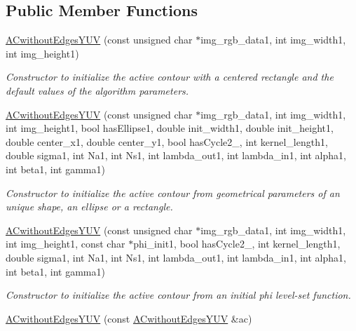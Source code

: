 \subsection*{Public Member Functions}
\begin{DoxyCompactItemize}
\item 
\hypertarget{classofeli_1_1_a_cwithout_edges_y_u_v_a80d0dc7b755e098cf08f1e155ec3e685}{\hyperlink{classofeli_1_1_a_cwithout_edges_y_u_v_a80d0dc7b755e098cf08f1e155ec3e685}{A\-Cwithout\-Edges\-Y\-U\-V} (const unsigned char $\ast$img\-\_\-rgb\-\_\-data1, int img\-\_\-width1, int img\-\_\-height1)}\label{classofeli_1_1_a_cwithout_edges_y_u_v_a80d0dc7b755e098cf08f1e155ec3e685}

\begin{DoxyCompactList}\small\item\em Constructor to initialize the active contour with a centered rectangle and the default values of the algorithm parameters. \end{DoxyCompactList}\item 
\hyperlink{classofeli_1_1_a_cwithout_edges_y_u_v_a31765b6ebe4825cc2a1ea815d1235c22}{A\-Cwithout\-Edges\-Y\-U\-V} (const unsigned char $\ast$img\-\_\-rgb\-\_\-data1, int img\-\_\-width1, int img\-\_\-height1, bool has\-Ellipse1, double init\-\_\-width1, double init\-\_\-height1, double center\-\_\-x1, double center\-\_\-y1, bool has\-Cycle2\-\_, int kernel\-\_\-length1, double sigma1, int Na1, int Ns1, int lambda\-\_\-out1, int lambda\-\_\-in1, int alpha1, int beta1, int gamma1)
\begin{DoxyCompactList}\small\item\em Constructor to initialize the active contour from geometrical parameters of an unique shape, an ellipse or a rectangle. \end{DoxyCompactList}\item 
\hyperlink{classofeli_1_1_a_cwithout_edges_y_u_v_a63c5bcb0da045d930be9be686c5f5245}{A\-Cwithout\-Edges\-Y\-U\-V} (const unsigned char $\ast$img\-\_\-rgb\-\_\-data1, int img\-\_\-width1, int img\-\_\-height1, const char $\ast$phi\-\_\-init1, bool has\-Cycle2\-\_, int kernel\-\_\-length1, double sigma1, int Na1, int Ns1, int lambda\-\_\-out1, int lambda\-\_\-in1, int alpha1, int beta1, int gamma1)
\begin{DoxyCompactList}\small\item\em Constructor to initialize the active contour from an initial phi level-\/set function. \end{DoxyCompactList}\item 
\hypertarget{classofeli_1_1_a_cwithout_edges_y_u_v_af4dc029288e6d49b6ac9c5a506a6b746}{\hyperlink{classofeli_1_1_a_cwithout_edges_y_u_v_af4dc029288e6d49b6ac9c5a506a6b746}{A\-Cwithout\-Edges\-Y\-U\-V} (const \hyperlink{classofeli_1_1_a_cwithout_edges_y_u_v}{A\-Cwithout\-Edges\-Y\-U\-V} \&ac)}\label{classofeli_1_1_a_cwithout_edges_y_u_v_af4dc029288e6d49b6ac9c5a506a6b746}


\end{DoxyCompactItemize}
